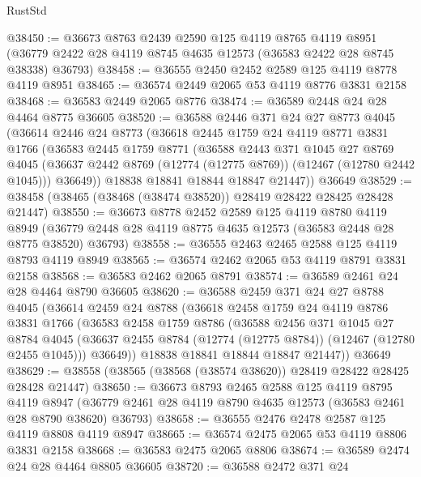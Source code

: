 \begin{lexlean}{RustStd}
\begin{coremodule}
@38450 := @36673
    @8763
    @2439
    @2590
    @125
    @4119
    @8765
    @4119
    @8951
    (@36779 @2422 @28 @4119 @8745 @4635 @12573 (@36583 @2422 @28 @8745 @38338) @36793)
@38458 := @36555 @2450 @2452 @2589 @125 @4119 @8778 @4119 @8951
@38465 := @36574 @2449 @2065 @53 @4119 @8776 @3831 @2158
@38468 := @36583 @2449 @2065 @8776
@38474 := @36589 @2448 @24 @28 @4464 @8775 @36605
@38520 := @36588
    @2446
    @371
    @24
    @27
    @8773
    @4045
    (@36614
      @2446
      @24
      @8773
      (@36618
        @2445
        @1759
        @24
        @4119
        @8771
        @3831
        @1766
        (@36583
          @2445
          @1759
          @8771
          (@36588
            @2443
            @371
            @1045
            @27
            @8769
            @4045
            (@36637 @2442 @8769 (@12774 (@12775 @8769)) (@12467 (@12780 @2442 @1045)))
            @36649))
        @18838
        @18841
        @18844
        @18847
        @21447))
    @36649
@38529 := @38458 (@38465 (@38468 (@38474 @38520)) @28419 @28422 @28425 @28428 @21447)
@38550 := @36673
    @8778
    @2452
    @2589
    @125
    @4119
    @8780
    @4119
    @8949
    (@36779 @2448 @28 @4119 @8775 @4635 @12573 (@36583 @2448 @28 @8775 @38520) @36793)
@38558 := @36555 @2463 @2465 @2588 @125 @4119 @8793 @4119 @8949
@38565 := @36574 @2462 @2065 @53 @4119 @8791 @3831 @2158
@38568 := @36583 @2462 @2065 @8791
@38574 := @36589 @2461 @24 @28 @4464 @8790 @36605
@38620 := @36588
    @2459
    @371
    @24
    @27
    @8788
    @4045
    (@36614
      @2459
      @24
      @8788
      (@36618
        @2458
        @1759
        @24
        @4119
        @8786
        @3831
        @1766
        (@36583
          @2458
          @1759
          @8786
          (@36588
            @2456
            @371
            @1045
            @27
            @8784
            @4045
            (@36637 @2455 @8784 (@12774 (@12775 @8784)) (@12467 (@12780 @2455 @1045)))
            @36649))
        @18838
        @18841
        @18844
        @18847
        @21447))
    @36649
@38629 := @38558 (@38565 (@38568 (@38574 @38620)) @28419 @28422 @28425 @28428 @21447)
@38650 := @36673
    @8793
    @2465
    @2588
    @125
    @4119
    @8795
    @4119
    @8947
    (@36779 @2461 @28 @4119 @8790 @4635 @12573 (@36583 @2461 @28 @8790 @38620) @36793)
@38658 := @36555 @2476 @2478 @2587 @125 @4119 @8808 @4119 @8947
@38665 := @36574 @2475 @2065 @53 @4119 @8806 @3831 @2158
@38668 := @36583 @2475 @2065 @8806
@38674 := @36589 @2474 @24 @28 @4464 @8805 @36605
@38720 := @36588
    @2472
    @371
    @24

\end{coremodule}
\end{lexlean}
